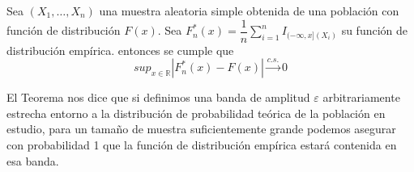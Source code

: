 \begin{teorema}
Sea $(X_1,\ldots,X_n)$ una muestra aleatoria simple obtenida de una poblaci\'on con funci\'on de distribuci\'on $F(x)$. Sea $F_n^*(x)=\dfrac{1}{n}\sum_{i=1}^nI_{(-\infty,x](X_i)}$ su funci\'on de distribuci\'on emp\'irica. entonces se cumple que 
\begin{equation*}
sup_{x\in\mathbb{R}}\left|F_n^*(x)-F(x)\right|\overset{c.s.}{\to}0
\end{equation*}

\end{teorema}

El Teorema nos dice que si definimos una banda de amplitud $\varepsilon$ arbitrariamente estrecha entorno a la distribuci\'on de probabilidad te\'orica de la poblaci\'on en estudio, para un tama\~no de muestra suficientemente grande podemos asegurar con probabilidad 1 que la funci\'on de distribuci\'on emp\'irica estar\'a contenida en esa banda.